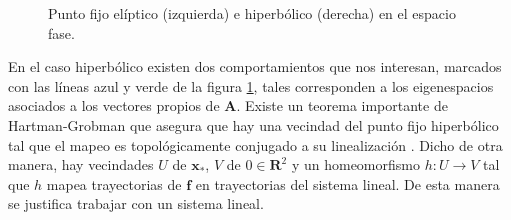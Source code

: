 \begin{figure}[h!]
	\centering
	\caption{Punto fijo elíptico (izquierda) e hiperbólico (derecha) en el espacio fase.}
	\label{hiperbolic}
\end{figure}


En el caso hiperbólico existen dos comportamientos que nos interesan, marcados con las líneas azul y verde de la figura \ref{hiperbolic}, tales corresponden a los eigenespacios asociados a los vectores propios de $\mathbf{A}$. Existe un teorema importante de Hart\-man-Grob\-man que asegura que hay una vecindad del punto fijo hiperbólico tal que el mapeo es topológicamente conjugado a su linealización \cite{Meiss,Meyer,Juergen}. Dicho de otra manera, hay vecindades $U$ de $\mathbf{x}_{*}$, $V$ de $0 \in \mathbf{R}^{2}$ y un homeomorfismo $h:U\rightarrow V$ tal que $h$ mapea trayectorias de $\mathbf{f}$ en trayectorias del sistema lineal. De esta manera se justifica trabajar con un sistema lineal.



